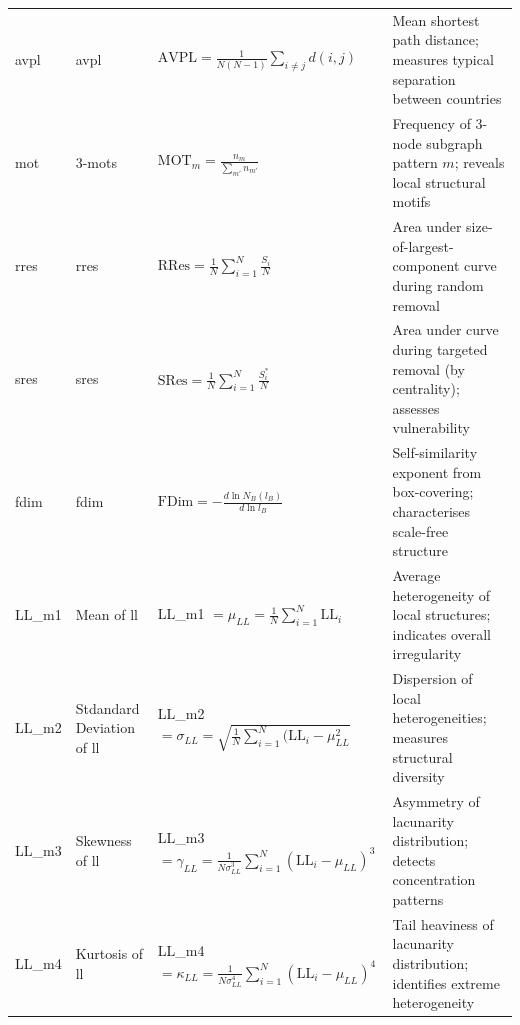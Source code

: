 \documentclass[preprint, 3p,
authoryear]{elsarticle} %
\begin{document}
\begin{longtable}{p{1.2cm}p{3.5cm}p{5.5cm}p{5cm}}
\acrshort{avpl} & \acrlong{avpl} & $\text{AVPL} = \frac{1}{N(N-1)} \sum_{i \neq j} d(i,j)$ & Mean shortest path distance; measures typical separation between countries \\
\addlinespace


\acrshort{mot} & 3-\acrlong{mot}s & $\text{MOT}_m = \frac{n_m}{\sum_{m'} n_{m'}}$ & Frequency of 3-node subgraph pattern $m$; reveals local structural motifs \\
\addlinespace

\acrshort{rres} & \acrlong{rres} & $\text{RRes} = \frac{1}{N} \sum_{i=1}^{N} \frac{S_i}{N}$ & Area under size-of-largest-component curve during random removal \\
\addlinespace

\acrshort{sres} & \acrlong{sres} & $\text{SRes} = \frac{1}{N} \sum_{i=1}^{N} \frac{S_i^*}{N}$ & Area under curve during targeted removal (by centrality); assesses vulnerability \\
\addlinespace

\acrshort{fdim} & \acrlong{fdim} & $\text{FDim} = -\frac{d \ln N_B(l_B)}{d \ln l_B}$ & Self-similarity exponent from box-covering; characterises scale-free structure \\
\addlinespace

LL\_m1 & Mean of \acrlong{ll} & LL\_m1  $=\mu_{LL}= \frac{1}{N} \sum_{i=1}^{N} \text{LL}_i$ & Average heterogeneity of local structures; indicates overall irregularity \\
\addlinespace

LL\_m2 & Stdandard Deviation of \acrlong{ll} & LL\_m2$=\sigma_{LL}=\sqrt{\frac{1}{N} \sum_{i=1}^{N} (\text{LL}_i - \mu_{LL}^2}$ & Dispersion of local heterogeneities; measures structural diversity \\
\addlinespace

LL\_m3 & Skewness of \acrlong{ll} & LL\_m3 $=\gamma_{LL}= \frac{1}{N \sigma_{LL}^3} \sum_{i=1}^{N} (\text{LL}_i - \mu_{LL})^3$ & Asymmetry of lacunarity distribution; detects concentration patterns \\
\addlinespace

LL\_m4 & Kurtosis of \acrlong{ll} & LL\_m4 $=\kappa_{LL} = \frac{1}{N \sigma_{LL}^4} \sum_{i=1}^{N} (\text{LL}_i - \mu_{LL})^4$ & Tail heaviness of lacunarity distribution; identifies extreme heterogeneity \\

\bottomrule
\end{longtable}
\end{document}
